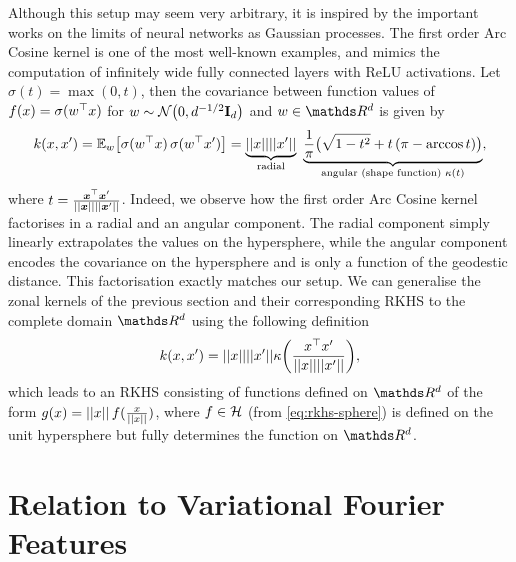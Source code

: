 Although this setup may seem very arbitrary, it is inspired by the important works on the limits of neural networks as Gaussian processes. The first order Arc Cosine kernel \citep{cho2009kernel} is one of the most well-known examples, and mimics the computation of infinitely wide fully connected layers with ReLU activations. Let $\sigma(t) = \max(0, t)$, then the covariance between function values of $f(x) = \sigma(w^{\top} x)$ for $w \sim \NormDist{0, d^{-1/2} \Eye_d}$ and $w \in \Reals^d$ is given by
\begin{equation}
\label{eq:arccosine}
    k(x, x') = \Exp{w}{\sigma(w\transpose x)\, \sigma(w\transpose x')} = \underbrace{\norm{x} \norm{x'}}_{\text{radial}}\ \underbrace{\frac{1}{\pi}\big( \sqrt{1 - t^2} + t\, (\pi - \arccos t) \big)}_{\text{angular (shape function) } \kappa(t)},
\end{equation}
where $t = \frac{\bm{x}^\top \bm{x}'}{\lvert\lvert \bm{x}\rvert\rvert\lvert\lvert \bm{x}'\rvert\rvert}$. Indeed, we observe how the first order Arc Cosine kernel factorises in a radial and an angular component. The radial component simply linearly extrapolates the values on the hypersphere, while the angular component encodes the covariance on the hypersphere and is only a function of the geodestic distance. This factorisation exactly matches our setup. We can generalise the zonal kernels of the previous section and their corresponding RKHS to the complete domain $\Reals^d$ using the following definition
\begin{equation}
    k(x, x') = \norm{x} \norm{x'} \kappa\left( \frac{x^\top x'}{\norm{x}\norm{x'}} \right), %
\end{equation}
which leads to an RKHS consisting of functions defined on $\Reals^d$ of the form $g(x) = \lvert\lvert x\rvert\rvert\,f(\frac{x}{\lvert\lvert x\rvert\rvert})$, where $f \in {\mathcal{H}}$ (from \cref{eq:rkhs-sphere}) is defined on the unit hypersphere but fully determines the function on $\Reals^d$.


\section{Relation to Variational Fourier Features}

